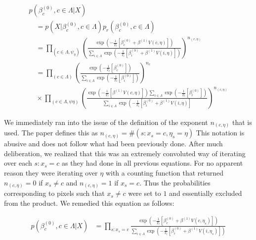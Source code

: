 \documentclass[11pt]{article}
\begin{document}
\begin{equation}
\begin{array}{l}
p\left(\beta_{c}^{(0)}, c \in \Lambda | X\right) \\
\quad=p\left(X | \beta_{c}^{(0)}, c \in \Lambda\right) p_{r}\left(\beta_{c}^{(0)}, c \in \Lambda\right) \\
\quad=\prod_{\left(c \in \Lambda, \psi_{\eta}\right)}\left(\frac{\exp \left(-\frac{1}{T_{t}}\left[\beta_{c}^{(0)}+\beta^{(1)} V(c, \eta)\right]\right)}{\sum_{i \in \Lambda} \exp \left(-\frac{1}{T_{t}}\left[\beta_{i}^{(0)}+\beta^{(1)} V(i, \eta)\right]\right)}\right)^{n_{(c, \eta)}} \\
\quad=\prod_{(c \in \Lambda)}\left(\frac{\exp \left(-\frac{1}{T_{t}}\left[\beta_{c}^{(0)}\right]\right)}{\sum_{i \in \Lambda} \exp \left(-\frac{1}{T_{t}}\left[\beta_{i}^{(0)}\right]\right)}\right)^{n_{c}} \\
\quad \times \prod_{(c \in \Lambda, \psi \eta)}\left(\frac{\exp \left(-\frac{1}{T_{t}}\left[\beta^{(1)} V(c, \eta)\right]\right) \sum_{i \in \Lambda} \exp \left(-\frac{1}{T_{t}}\left[\beta_{i}^{(0)}\right]\right)}{\sum_{i \in \Lambda} \exp \left(-\frac{1}{T_{t}}\left[\beta_{i}^{(0)}+\beta^{(1)} V(i, \eta)\right]\right.}\right)^{n_{(c, \eta)}}
\end{array}
\end{equation}

We immediately ran into the issue of the definition of the exponent $n_{(c, \eta)}$ that is used.
The paper defines this as $n_{(c, \eta)}=\#\left(s: x_{s}=c, \eta_{s}=\eta\right)$
This notation is abusive and does not follow what had been previously done.
After much deliberation, we realized that this was an extremely convoluted way of iterating over each $s:x_{s} = c$ as they had done in all previous equations.
For no apparent reason they were iterating over $\eta$ with a counting function that returned $n_{(c, \eta)}=0$ if $x_{s} \neq c$ and $n_{(c, \eta)}=1$ if $x_{s} = c$. Thus the probabilities corresponding to pixels such that $x_{s} \neq c$ were set to $1$ and essentially excluded from the product.
We remedied this equation as follows:

\begin{equation}
\begin{aligned}
p\left(\beta_{c}^{(0)}, c \in \Lambda | X\right) & = \prod_{s:x_{s} = c}\frac{\exp \left(-\frac{1}{T_{t}}\left[\beta_{c}^{(0)}+\beta^{(1)} V(c, \eta_{s})\right]\right)}{\sum_{i \in \Lambda} \exp \left(-\frac{1}{T_{t}}\left[\beta_{i}^{(0)}+\beta^{(1)} V(i, \eta_{s})\right]\right)}
\end{aligned}
\end{equation}
\end{document}
